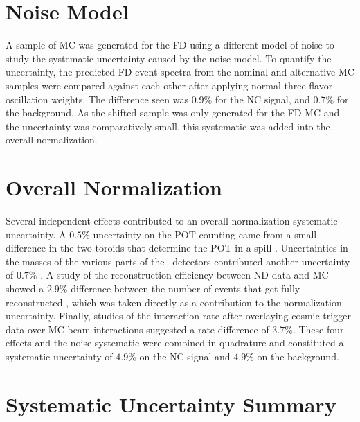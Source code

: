 \section{Noise Model}
\label{sec:SystNoise}

A sample of MC was generated for the FD using a different model of noise to study the systematic uncertainty caused by the noise model. To quantify the uncertainty, the predicted FD event spectra from the nominal and alternative MC samples were compared against each other after applying normal three flavor oscillation weights. The difference seen was $0.9\%$ for the NC signal, and $0.7\%$ for the background. As the shifted sample was only generated for the FD MC and the uncertainty was comparatively small, this systematic was added into the overall normalization.

\section{Overall Normalization}
\label{sec:SystNorm}

Several independent effects contributed to an overall normalization systematic uncertainty. A $0.5\%$ uncertainty on the POT counting came from a small difference in the two toroids that determine the POT in a spill \cite{ref:TNBeam}. Uncertainties in the masses of the various parts of the \nova~detectors contributed another uncertainty of $0.7\%$ \cite{ref:MassError}. A study of the reconstruction efficiency between ND data and MC showed a $2.9\%$ difference between the number of events that get fully reconstructed \cite{ref:NDDataMCRecoEff}, which was taken directly as a contribution to the normalization uncertainty. Finally, studies of the interaction rate after overlaying cosmic trigger data over MC beam interactions suggested a rate difference of $3.7\%$. These four effects and the noise systematic were combined in quadrature and constituted a systematic uncertainty of $4.9\%$ on the NC signal and $4.9\%$ on the background.

\section{Systematic Uncertainty Summary}
\label{sec:SystSummary}


